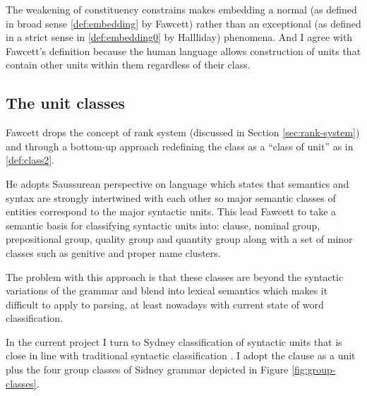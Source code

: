 The weakening of constituency constrains makes embedding a normal (as defined in broad sense \ref{def:embedding} by Fawcett) rather than an exceptional (as defined in a strict sense in \ref{def:embedding0} by Hallliday) phenomena. And I agree with Fawcett's definition because the human language allows construction of units that contain other units within them regardless of their class.

\subsection{The unit classes}
Fawcett drops the concept of rank system (discussed in Section \ref{sec:rank-system}) and through a bottom-up approach redefining the class as a ``class of unit'' as in \ref{def:class2}.

He adopts Saussurean perspective on language which states that semantics and syntax are strongly intertwined with each other so major semantic classes of entities correspond to the major syntactic units. This lead Fawcett to take a semantic basis for classifying syntactic units into: clause, nominal group, prepositional group, quality group and quantity group \citep[p.~193--194]{Fawcett2000} along with a set of minor classes such as genitive and proper name clusters. 

The problem with this approach is that these classes are beyond the syntactic variations of the grammar and blend into lexical semantics which makes it difficult to apply to parsing, at least nowadays with current state of word classification.   

In the current project I turn to Sydney classification of syntactic units that is close in line with traditional syntactic classification \citep{Quirk1985}. I adopt the clause as a unit plus the four group classes of Sidney grammar depicted in Figure \ref{fig:group-classes}.

